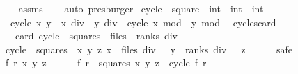 \begin{isabellebody}
%
\isadelimproof
\ \ %
\endisadelimproof
%
\isatagproof
{}\isamarkupfalse%
\ assms\isanewline
\ \ \isamarkupfalse%
\ auto\ presburger{\isacharplus}%
\endisatagproof
{\isafoldproof}%
%
\isadelimproof
\isanewline
%
\endisadelimproof
\isanewline
{}\isamarkupfalse%
\ cycle\ {\isacharcolon}{\isacharcolon}\ {\isachardoublequoteopen}square\ {\isasymRightarrow}\ int\ {\isasymtimes}\ int\ {\isasymtimes}\ int{\isachardoublequoteclose}\ \isanewline
\ \ {\isachardoublequoteopen}cycle\ {\isacharparenleft}x{\isacharcomma}\ y{\isacharparenright}\ {\isacharequal}\ {\isacharparenleft}x\ div\ {}{\isacharcomma}\ y\ div\ {}{\isacharcomma}\ cycle{}\ {\isacharparenleft}x\ mod\ {}{\isacharcomma}\ y\ mod\ {}{\isacharparenright}{\isacharparenright}{\isachardoublequoteclose}\isanewline
\isanewline
{}\isamarkupfalse%
\ cycles{\isacharunderscore}card{\isacharcolon}\isanewline
\ \ \ {\isachardoublequoteopen}card\ {\isacharparenleft}cycle\ {\isacharbackquote}\ squares{\isacharparenright}\ {\isacharequal}\ {\isacharparenleft}files\ {\isacharasterisk}\ ranks{\isacharparenright}\ div\ {}{\isachardoublequoteclose}\isanewline
%
\isadelimproof
%
\endisadelimproof
%
\isatagproof
{}\isamarkupfalse%
{\isacharminus}\isanewline
\ \ \isamarkupfalse%
\ {\isachardoublequoteopen}cycle\ {\isacharbackquote}\ squares\ {\isacharequal}\ {\isacharbraceleft}{\isacharparenleft}x{\isacharcomma}\ y{\isacharcomma}\ z{\isacharparenright}{\isachardot}\ x\ {\isasymin}\ {\isacharbraceleft}{}{\isachardot}{\isachardot}{\isacharless}files\ div\ {}{\isacharbraceright}\ {\isasymand}\ y\ {\isasymin}\ {\isacharbraceleft}{}{\isachardot}{\isachardot}{\isacharless}ranks\ div\ {}{\isacharbraceright}\ {\isasymand}\ z\ {\isasymin}\ {\isacharbraceleft}{}{\isachardot}{\isachardot}{\isacharless}{}{\isacharbraceright}{\isacharbraceright}{\isachardoublequoteclose}\isanewline
\ \ \isamarkupfalse%
\ safe\isanewline
\ \ \ \ \isamarkupfalse%
\ f\ r\ x\ y\ z\isanewline
\ \ \ \ \isamarkupfalse%
\ {\isachardoublequoteopen}{\isacharparenleft}f{\isacharcomma}\ r{\isacharparenright}\ {\isasymin}\ squares{\isachardoublequoteclose}\ {\isachardoublequoteopen}{\isacharparenleft}x{\isacharcomma}\ y{\isacharcomma}\ z{\isacharparenright}\ {\isacharequal}\ cycle\ {\isacharparenleft}f{\isacharcomma}\ r{\isacharparenright}{\isachardoublequoteclose}\isanewline

\end{isabellebody}
